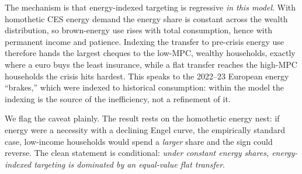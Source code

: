 The mechanism is that energy-indexed targeting is regressive \emph{in this model}.
With homothetic CES energy demand the energy share is constant across the wealth
distribution, so brown-energy use rises with total consumption, hence with
permanent income and patience. Indexing the transfer to pre-crisis energy use
therefore hands the largest cheques to the low-MPC, wealthy households, exactly
where a euro buys the least insurance, while a flat transfer reaches the high-MPC
households the crisis hits hardest. This speaks to the 2022--23 European energy
``brakes,'' which were indexed to historical consumption: within the model the
indexing is the source of the inefficiency, not a refinement of it.

We flag the caveat plainly. The result rests on the homothetic energy nest: if
energy were a necessity with a declining Engel curve, the empirically standard
case, low-income households would spend a \emph{larger} share and the sign could
reverse. The clean statement is conditional: \emph{under constant energy shares,
energy-indexed targeting is dominated by an equal-value flat transfer}.


